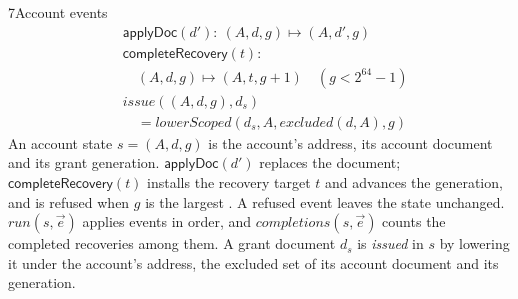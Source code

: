 \begin{perchdefinition}{7}{Account events}\label{def:account-events}
\[\begin{aligned}&\mathsf{applyDoc}(d'):\ (A, d, g) \mapsto (A, d', g)\\
&\mathsf{completeRecovery}(t):\\
&\quad (A, d, g) \mapsto (A, t, g + 1) \quad (g < 2^{64} - 1)\\
&\mathit{issue}((A, d, g), d_s)\\
&\quad = \mathit{lowerScoped}(d_s, A, \mathit{excluded}(d, A), g)\end{aligned}\]
An account state \(s = (A, d, g)\) is the account's address, its account document and its grant generation. \(\mathsf{applyDoc}(d')\) replaces the document; \(\mathsf{completeRecovery}(t)\) installs the recovery target \(t\) and advances the generation, and is refused when \(g\) is the largest . A refused event leaves the state unchanged. \(\mathit{run}(s, \vec e)\) applies events in order, and \(\mathit{completions}(s, \vec e)\) counts the completed recoveries among them. A grant document \(d_s\) is \emph{issued} in \(s\) by lowering it under the account's address, the excluded set of its account document and its generation.
\end{perchdefinition}
